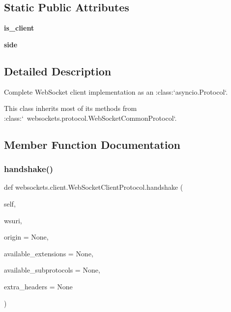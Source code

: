 \subsection*{Static Public Attributes}
\begin{DoxyCompactItemize}
\item 
\mbox{\label{classwebsockets_1_1client_1_1_web_socket_client_protocol_ac4ccda8f5c1b99df67cad01dd044758f}} 
{\bfseries is\+\_\+client}
\item 
\mbox{\label{classwebsockets_1_1client_1_1_web_socket_client_protocol_ad9cbea6f8c846640195d14ae72327f11}} 
{\bfseries side}
\end{DoxyCompactItemize}


\subsection{Detailed Description}
\begin{DoxyVerb}Complete WebSocket client implementation as an :class:`asyncio.Protocol`.

This class inherits most of its methods from
:class:`~websockets.protocol.WebSocketCommonProtocol`.\end{DoxyVerb}
 

\subsection{Member Function Documentation}
\mbox{\label{classwebsockets_1_1client_1_1_web_socket_client_protocol_a8f6a8cb75ab7e2437f69acd292632e25}} 
\subsubsection{\texorpdfstring{handshake()}{handshake()}}
{\footnotesize\ttfamily def websockets.\+client.\+Web\+Socket\+Client\+Protocol.\+handshake (\begin{DoxyParamCaption}\item[{}]{self,  }\item[{}]{wsuri,  }\item[{}]{origin = {\ttfamily None},  }\item[{}]{available\+\_\+extensions = {\ttfamily None},  }\item[{}]{available\+\_\+subprotocols = {\ttfamily None},  }\item[{}]{extra\+\_\+headers = {\ttfamily None} }\end{DoxyParamCaption})}

